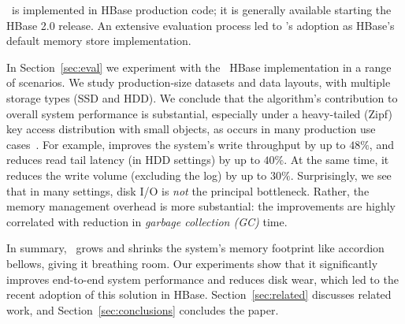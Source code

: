 \sys\ is implemented in HBase production code; it is generally available starting the HBase 2.0 release. 
An extensive evaluation process led to \sys's adoption as HBase's default memory store implementation. 

In Section~\ref{sec:eval} we experiment with the \sys\ HBase implementation in a range of scenarios.
We study production-size datasets and data layouts, with multiple storage types (SSD and HDD). 
We conclude that the algorithm's contribution to overall system performance is substantial, 
especially under a  heavy-tailed (Zipf) key access distribution with 
small objects, as occurs in many production use cases~\cite{Wu2015}. For example, \sys\/ 
improves the system's write throughput by up to $48\%$, and reduces read tail latency 
(in HDD settings)  
by up to $40\%$. At the same time, it reduces the write volume (excluding the log) by up to $30\%$. Surprisingly, we see 
that in many settings, disk I/O is \emph{not} the principal bottleneck. Rather, the memory management 
overhead is more substantial: the improvements are highly correlated with  reduction in \emph{garbage collection (GC)} time. 

In summary, \sys\ grows and shrinks the system's memory footprint like accordion bellows, giving it breathing 
room. Our experiments show that it significantly improves end-to-end system performance and reduces disk wear, 
which led to the recent adoption of this solution in HBase. Section~\ref{sec:related} discusses related work, 
and Section~\ref{sec:conclusions} concludes the paper.

